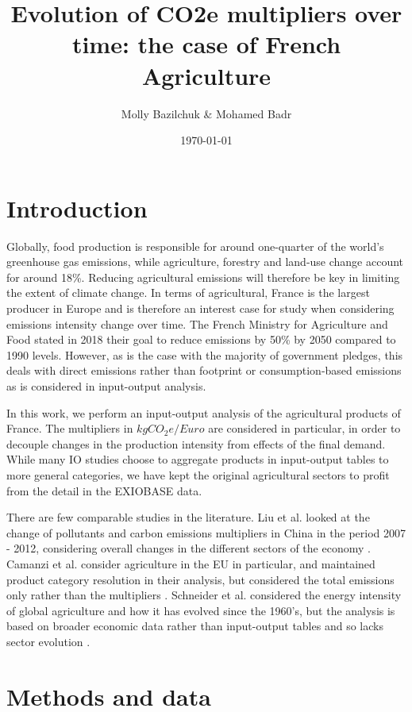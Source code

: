 \documentclass[a4paper,twoside]{article}
\title{Evolution of CO2e multipliers over time: the case of French Agriculture}
\author{Molly Bazilchuk & Mohamed Badr}
\date{\today}
\begin{document}
\maketitle
\vspace{3cm}


\section{Introduction}

Globally, food production is responsible for around one-quarter of the world's greenhouse gas emissions, while agriculture, forestry and land-use change account for around 18\%. Reducing agricultural emissions will therefore be key in limiting the extent of climate change. In terms of agricultural, France is the largest producer in Europe and is therefore an interest case for study when considering emissions intensity change over time. The French Ministry for Agriculture and Food stated in 2018 their goal to reduce emissions by 50\% by 2050 compared to 1990 levels. However, as is the case with the majority of government pledges, this deals with direct emissions rather than footprint or consumption-based emissions as is considered in input-output analysis. 

In this work, we perform an input-output analysis of the agricultural products of France. The multipliers in $kgCO_2e/Euro$ are considered in particular, in order to decouple changes in the production intensity from effects of the final demand. While many IO studies choose to aggregate products in input-output tables to more general categories, we have kept the original agricultural sectors to profit from the detail in the EXIOBASE data.

There are few comparable studies in the literature. Liu et al. looked at the change of pollutants and carbon emissions multipliers in China in the period 2007 - 2012, considering overall changes in the different sectors of the economy \cite{Liu2017}. Camanzi et al. consider agriculture in the EU in particular, and maintained product category resolution in their analysis, but considered the total emissions only rather than the multipliers \cite{Camanzi2017}. Schneider et al. considered the energy intensity of global agriculture and how it has evolved since the 1960's, but the analysis is based on broader economic data rather than input-output tables and so lacks sector evolution \cite{Schneider2009}.

\section{Methods and data}
\end{document}
